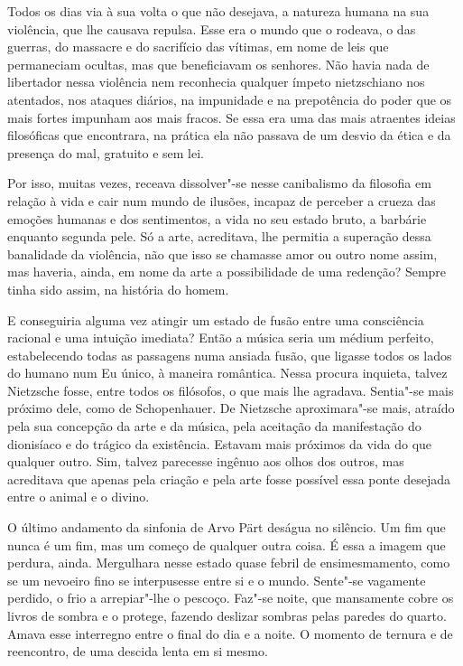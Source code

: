 Todos os dias via à sua volta o que não desejava, a natureza humana na
sua violência, que lhe causava repulsa. Esse era o mundo que o rodeava,
o das guerras, do massacre e do sacrifício das vítimas, em nome de leis
que permaneciam ocultas, mas que beneficiavam os senhores. Não havia
nada de libertador nessa violência nem reconhecia qualquer ímpeto
nietzschiano nos atentados, nos ataques diários, na impunidade e na
prepotência do poder que os mais fortes impunham aos mais fracos. Se
essa era uma das mais atraentes ideias filosóficas que encontrara, na
prática ela não passava de um desvio da ética e da presença do mal,
gratuito e sem lei.

Por isso, muitas vezes, receava dissolver"-se nesse canibalismo da
filosofia em relação à vida e cair num mundo de ilusões, incapaz de
perceber a crueza das emoções humanas e dos sentimentos, a vida no seu
estado bruto, a barbárie enquanto segunda pele. Só a arte, acreditava,
lhe permitia a superação dessa banalidade da violência, não que isso se
chamasse amor ou outro nome assim, mas haveria, ainda, em nome da arte a
possibilidade de uma redenção? Sempre tinha sido assim, na história do
homem.

E conseguiria alguma vez atingir um estado de fusão entre uma
consciência racional e uma intuição imediata? Então a música seria um
médium perfeito, estabelecendo todas as passagens numa ansiada fusão,
que ligasse todos os lados do humano num Eu único, à maneira romântica.
Nessa procura inquieta, talvez Nietzsche fosse, entre todos os
filósofos, o que mais lhe agradava. Sentia"-se mais próximo dele, como de
Schopenhauer. De Nietzsche aproximara"-se mais, atraído pela sua
concepção da arte e da música, pela aceitação da manifestação do
dionisíaco e do trágico da existência. Estavam mais próximos da vida do
que qualquer outro. Sim, talvez parecesse ingênuo aos olhos dos outros,
mas acreditava que apenas pela criação e pela arte fosse possível essa
ponte desejada entre o animal e o divino.

O último andamento da sinfonia de Arvo Pärt deságua no silêncio. Um fim
que nunca é um fim, mas um começo de qualquer outra coisa. É essa a
imagem que perdura, ainda. Mergulhara nesse estado quase febril de
ensimesmamento, como se um nevoeiro fino se interpusesse entre si e o
mundo. Sente"-se vagamente perdido, o frio a arrepiar"-lhe o pescoço.
Faz"-se noite, que mansamente cobre os livros de sombra e o protege,
fazendo deslizar sombras pelas paredes do quarto. Amava esse interregno
entre o final do dia e a noite. O momento de ternura e de reencontro, de
uma descida lenta em si mesmo.


